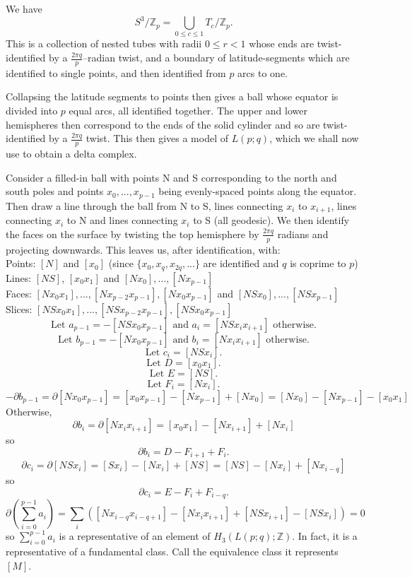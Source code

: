 \documentclass{article}
\begin{document}
We have \[S^3/\mathbb{Z}_p=\bigcup_{0\leq c\leq 1}T_c/\mathbb{Z}_p.\] This is a collection of nested tubes with radii $0\leq r<1$ whose ends are twist-identified by a $\frac{2\pi q}{p}$--radian twist, and a boundary of latitude-segments which are identified to single points, and then identified from $p$ arcs to one.

Collapsing the latitude segments to points then gives a ball whose equator is divided into $p$ equal arcs, all identified together. The upper and lower hemispheres then correspond to the ends of the solid cylinder and so are twist-identified by a $\frac{2\pi q}{p}$ twist. This then gives a model of $L(p;q)$, which we shall now use to obtain a delta complex.



\noindent Consider a filled-in ball with points N and S corresponding to the north and south poles and points $x_0,...,x_{p-1}$ being evenly-spaced points along the equator. Then draw a line through the ball from N to S, lines connecting $x_i$ to $x_{i+1}$, lines connecting $x_i$ to N and lines connecting $x_i$ to S (all geodesic). We then identify the faces on the surface by twisting the top hemisphere by $\frac{2\pi q}{p}$ radians and projecting downwards. This leaves us, after identification, with:\\
Points: $[N]$ and $[x_0]$ (since $\{x_0,x_q,x_{2q},...\}$ are identified and $q$ is coprime to $p$)\\
Lines: $[NS]$, $[x_0x_1]$ and $[Nx_0],...,[Nx_{p-1}]$\\
Faces: $[Nx_0x_1],...,[Nx_{p-2}x_{p-1}],[Nx_0x_{p-1}]$ and $[NSx_0],...,[NSx_{p-1}]$\\
Slices: $[NSx_0x_1],...,[NSx_{p-2}x_{p-1}],[NSx_0x_{p-1}]$\\
\[\text{Let }a_{p-1}=-[NSx_0x_{p-1}]\text{ and }a_i=[NSx_ix_{i+1}]\text{ otherwise.}\]
\[\text{Let }b_{p-1}=-[Nx_0x_{p-1}]\text{ and }b_i=[Nx_ix_{i+1}]\text{ otherwise.}\]
\[\text{Let }c_i=[NSx_i].\]
\[\text{Let }D=[x_0x_1].\]
\[\text{Let }E=[NS].\]
\[\text{Let }F_i=[Nx_i].\]
\[-\partial b_{p-1}=\partial[Nx_0x_{p-1}]=[x_0x_{p-1}]-[Nx_{p-1}]+[Nx_0]=[Nx_0]-[Nx_{p-1}]-[x_0x_1]\]
Otherwise, \[\partial b_i=\partial[Nx_ix_{i+1}]=[x_0x_1]-[Nx_{i+1}]+[Nx_i]\]
so \[\partial b_i=D-F_{i+1}+F_i.\]
\[\partial c_i=\partial[NSx_i]=[Sx_i]-[Nx_i]+[NS]=[NS]-[Nx_i]+[Nx_{i-q}]\]
so \[\partial c_i=E-F_i+F_{i-q}.\]
\[\partial(\sum_{i=0}^{p-1}a_i)=\sum_i([Nx_{i-q}x_{i-q+1}]-[Nx_ix_{i+1}]+[NSx_{i+1}]-[NSx_i])=0\] so $\sum_{i=0}^{p-1}a_i$ is a representative of an element of $H_3(L(p;q);\mathbb{Z})$. In fact, it is a representative of a fundamental class. Call the equivalence class it represents $[M]$.\\
\end{document}
